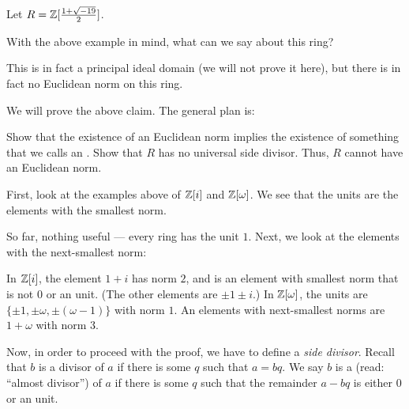 \begin{example}
	Let $R = \mathbb Z[\frac{1 + \sqrt{-19}}{2}]$.

	With the above example in mind, what can we say about this ring?

	This is in fact a principal ideal domain (we will not prove it here), but there is in fact no
	Euclidean norm on this ring.
\end{example}

We will prove the above claim. The general plan is:
\begin{itemize}
	\ii Show that the existence of an Euclidean norm implies the existence of something that we
	calls an .
	\ii Show that $R$ has no universal side divisor.
	\ii Thus, $R$ cannot have an Euclidean norm.
\end{itemize}

First, look at the examples above of $\mathbb Z[i]$ and $\mathbb Z[\omega]$. We see that the units are the
elements with the smallest norm.

So far, nothing useful --- every ring has the unit $1$. Next, we look at the elements with the
next-smallest norm:
\begin{itemize}
	\ii In $\mathbb Z[i]$, the element $1 + i$ has norm $2$, and is an element with smallest norm that is
	not $0$ or an unit. (The other elements are $\pm 1 \pm i$.)
	\ii In $\mathbb Z[\omega]$, the units are $\{ \pm 1, \pm \omega, \pm (\omega-1) \}$ with norm $1$. An
	elements with next-smallest norms are $1 + \omega$ with norm $3$.
\end{itemize}

Now, in order to proceed with the proof, we have to define a \emph{side divisor}.
Recall that $b$ is a divisor of $a$ if there is some $q$ such that $a = bq$.
We say $b$ is a  (read: ``almost divisor'') of $a$ if there is some $q$ such
that the remainder $a-bq$ is either $0$ or an unit.

